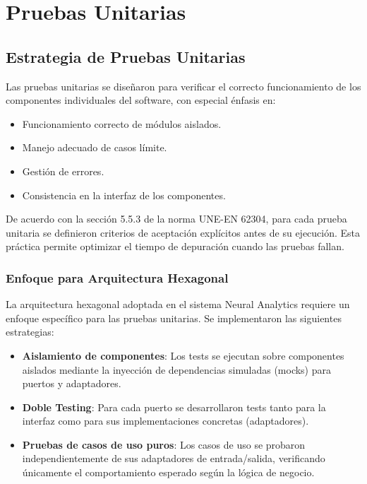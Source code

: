 \newpage
\section{Pruebas Unitarias}

\subsection{Estrategia de Pruebas Unitarias}

Las pruebas unitarias se diseñaron para verificar el correcto funcionamiento de los componentes individuales del software, con especial énfasis en:

\begin{itemize}
    \item Funcionamiento correcto de módulos aislados.
    \item Manejo adecuado de casos límite.
    \item Gestión de errores.
    \item Consistencia en la interfaz de los componentes.
\end{itemize}

De acuerdo con la sección 5.5.3 de la norma UNE-EN 62304, para cada prueba unitaria se definieron criterios de aceptación explícitos antes de su ejecución. Esta práctica permite optimizar el tiempo de depuración cuando las pruebas fallan.

\subsubsection{Enfoque para Arquitectura Hexagonal}

La arquitectura hexagonal adoptada en el sistema Neural Analytics requiere un enfoque específico para las pruebas unitarias. Se implementaron las siguientes estrategias:

\begin{itemize}
    \item \textbf{Aislamiento de componentes}: Los tests se ejecutan sobre componentes aislados mediante la inyección de dependencias simuladas (mocks) para puertos y adaptadores.
    
    \item \textbf{Doble Testing}: Para cada puerto se desarrollaron tests tanto para la interfaz como para sus implementaciones concretas (adaptadores).
    
    \item \textbf{Pruebas de casos de uso puros}: Los casos de uso se probaron independientemente de sus adaptadores de entrada/salida, verificando únicamente el comportamiento esperado según la lógica de negocio.
\end{itemize}

